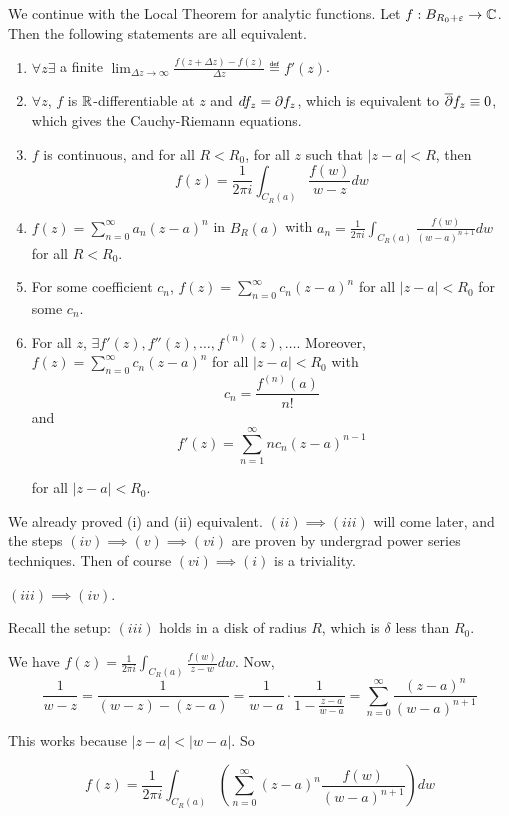\documentclass[x11names,reqno,14pt]{extarticle}
\newcommand{\oo}{{\infty}}
\begin{document}
We continue with the Local Theorem for analytic functions. Let $f:B_{R_0 + \varepsilon}\to \mathbb{C}$. Then the following statements are all equivalent. 
\begin{enumerate}[label=(\roman*)]
\item $\forall z \exists$ a finite $\lim_{\Delta z\to\oo}\frac{f(z + \Delta z) - f(z)}{\Delta z} \eqdef f'(z)$. 
\item $\forall z$, $f$ is $\mathbb{R}$-differentiable at $z$ and $df_z = \partial f_z$, which is equivalent to $\overline{\partial}f_z \equiv 0$, which gives the Cauchy-Riemann equations. 
\item $f$ is continuous, and for all $R < R_0$, for all $z$ such that $|z - a| < R$, then 
\[
f(z) = \frac{1}{2\pi i}\int_{C_R(a)}\frac{f(w)}{w - z}dw
\]
\item $f(z) = \sum_{n=0}^\oo a_n(z - a)^n$ in $B_R(a)$ with $a_n = \frac{1}{2\pi i}\int_{C_R(a)}\frac{f(w)}{(w - a)^{n + 1}}dw$ for all $R < R_0$. 
\item For some coefficient $c_n$, $f(z) = \sum_{n=0}^\oo c_n(z - a)^n$ for all $|z - a|< R_0$ for some $c_n$. 
\item For all $z$, $\exists f'(z), f''(z), \dots, f^{(n)}(z), \dots$. Moreover, $f(z) = \sum_{n=0}^\oo c_n(z - a)^n $ for all $|z - a| < R_0$ with 
\[
c_n = \frac{f^{(n)}(a)}{n!}
\]
and
\[
f'(z) = \sum_{n=1}^\oo nc_n(z - a)^{n - 1}
\]

for all $|z - a| < R_0$. 
\end{enumerate}

\proof

We already proved (i) and (ii) equivalent. $(ii)\implies(iii)$ will come later, and the steps $(iv)\implies(v)\implies(vi)$ are proven by undergrad power series techniques. Then of course $(vi)\implies(i)$ is a triviality. 

\claim $(iii)\implies(iv)$. 

\proof

Recall the setup: $(iii)$ holds in a disk of radius $R$, which is $\delta$ less than $R_0$. 

We have $f(z) = \frac{1}{2\pi i}\int_{C_R(a)}\frac{f(w)}{z - w}dw$. Now, 
\[
\frac{1}{w-z} = \frac{1}{(w - z) - (z - a)} = \frac{1}{w - a}\cdot\frac{1}{1 - \frac{z - a}{w - a}} = \sum_{n=0}^\oo\frac{(z - a)^n}{(w - a)^{n + 1}}
\]

This works because $|z - a| < |w - a|$. So 

\[
f(z) = \frac{1}{2\pi i}\int_{C_R(a)}\left(\sum_{n=0}^\oo(z - a)^n\frac{f(w)}{(w - a)^{n + 1}}\right)dw
\]
\end{document}
